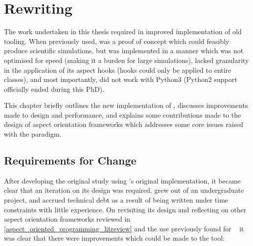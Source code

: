 \chapter{Rewriting \pdsf{}}\label{chap:pdsf_rewrite}




The work undertaken in this thesis required in improved implementation of old
tooling. When previously used, \pdsf{} was a proof of concept which could
feasibly produce scientific simulations, but was implemented in a manner which
was not optimised for speed (making it a burden for large simulations), lacked
granularity in the application of its aspect hooks (hooks could only be applied
to entire classes), and most importantly, did not work with Python3 (Python2
support officially ended during this PhD).  

This chapter briefly outlines the new implementation of \pdsf{}, discusses
improvements made to design and performance, and explains some contributions
made to the design of aspect orientation frameworks which addresses some core
issues raised with the paradigm. 


\section{Requirements for Change}\label{sec:pdsf3requirements}

After developing the original study using \pdsf{}'s original implementation, it
became clear that an iteration on its design was required. \pdsf{} grew out of
an undergraduate project, and accrued technical debt as a result of being
written under time constraints with little experience. On revisiting its design
and reflecting on other aspect orientation frameworks reviewed in  
\cref{aspect_oriented_programming_litreview} and the use previously found for
\pdsf{}~\cite{wallis2018caise,wallis2018genetic} it was clear that there were
improvements which could be made to the tool:

